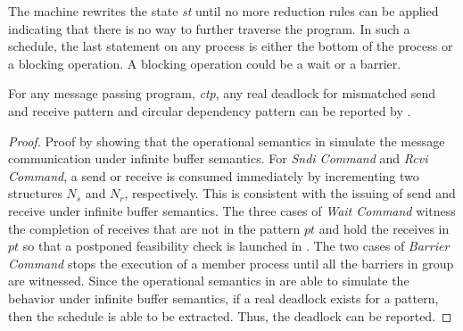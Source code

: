 The machine rewrites the state \textit{st} until no more reduction rules can be applied indicating that there is no way to further traverse the program. In such a schedule, the last statement on any process is either the bottom of the process or a blocking operation. A blocking operation could be a wait or a barrier. 


\begin{lemma}
For any message passing program, \textit{ctp}, any real deadlock for mismatched send and receive pattern and circular dependency pattern can be reported by .
\label{lemma:complete}
\end{lemma}
\begin{proof}
Proof by showing that the operational semantics in  simulate the message communication under infinite buffer semantics. For \emph{Sndi Command} and \emph{Rcvi Command}, a send or receive is consumed immediately by incrementing two structures $\mathit{N_s}$ and $\mathit{N_r}$, respectively. This is consistent with the issuing of send and receive under infinite buffer semantics. The three cases of \emph{Wait Command} witness the completion of receives that are not in the pattern $\mathit{pt}$ and hold the receives in $\mathit{pt}$ so that a postponed feasibility check is launched in . The two cases of \emph{Barrier Command} stops the execution of a member process until all the barriers in group are witnessed. Since the operational semantics in  are able to simulate the behavior under infinite buffer semantics, if a real deadlock exists for a pattern, then the schedule is able to be extracted. Thus, the deadlock can be reported.
\end{proof}
